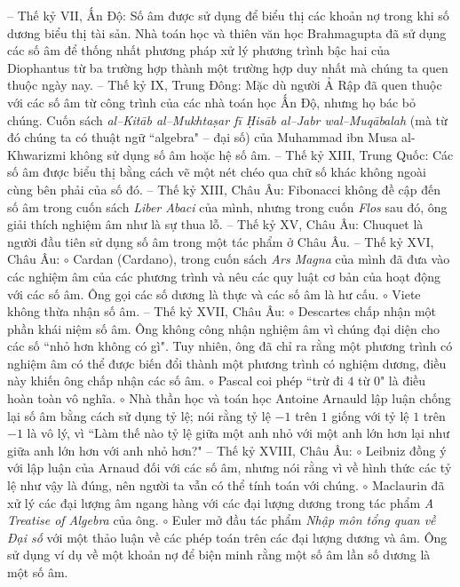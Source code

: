 \begin{multicols}{2}
	\vskip 0.1cm
	-- Thế kỷ VII, Ấn Độ: Số âm được sử dụng để biểu thị các khoản nợ trong khi số dương biểu thị tài sản. Nhà toán học và thiên văn học Brahmagupta đã sử dụng các số âm để thống nhất phương pháp xử lý phương trình bậc hai của Diophantus từ ba trường hợp thành một trường hợp duy nhất mà chúng ta quen thuộc ngày nay.
	\vskip 0.1cm
	-- Thế kỷ IX, Trung Đông: Mặc dù người Ả Rập đã quen thuộc với các số âm từ công trình của các nhà toán học Ấn Độ, nhưng họ bác bỏ chúng. Cuốn sách \textit{al--Kitāb al--Mukhtaṣar fī Ḥisāb al--Jabr wal--Muqābalah} (mà từ đó chúng ta có thuật ngữ ``algebra" -- đại số) của Muhammad ibn Musa al-Khwarizmi không sử dụng số âm hoặc hệ số âm.
	\vskip 0.1cm
	-- Thế kỷ XIII, Trung Quốc: Các số âm được biểu thị bằng cách vẽ một nét chéo qua chữ số khác không ngoài cùng bên phải của số đó.
	\vskip 0.1cm
	-- Thế kỷ XIII, Châu Âu: Fibonacci không đề cập đến số âm trong cuốn sách \textit{Liber Abaci} của mình, nhưng trong cuốn \textit{Flos} sau đó, ông giải thích nghiệm âm như là sự thua lỗ.
	\vskip 0.1cm
	-- Thế kỷ XV, Châu Âu: Chuquet là người đầu tiên sử dụng số âm trong một tác phẩm ở Châu Âu.
	\vskip 0.1cm
	-- Thế kỷ XVI, Châu Âu: 
	\vskip 0.1cm
	$\circ$ Cardan (Cardano), trong cuốn sách \textit{Ars Magna} của mình đã đưa vào các nghiệm âm của các phương trình và nêu các quy luật cơ bản của hoạt động với các số âm. Ông gọi các số dương là thực và các số âm là hư cấu.
	\vskip 0.1cm
	$\circ$ Viete không thừa nhận số âm.
	\vskip 0.1cm
	-- Thế kỷ XVII, Châu Âu:
	\vskip 0.1cm
	$\circ$ Descartes chấp nhận một phần khái niệm số âm. Ông không công nhận nghiệm âm vì chúng đại diện cho các số ``nhỏ hơn không có gì". Tuy nhiên, ông đã chỉ ra rằng một phương trình có nghiệm âm có thể được biến đổi thành một phương trình có nghiệm dương, điều này khiến ông chấp nhận các số âm.
	\vskip 0.1cm
	$\circ$ Pascal coi phép ``trừ đi $4$ từ 0" là điều hoàn toàn vô nghĩa.
	\vskip 0.1cm
	$\circ$ Nhà thần học và toán học Antoine Arnauld lập luận chống lại số âm bằng cách sử dụng tỷ lệ; nói rằng tỷ lệ $-1$ trên $1$ giống với tỷ lệ $1$ trên $-1$ là vô lý, vì ``Làm thế nào tỷ lệ giữa một anh nhỏ với một anh lớn hơn lại như giữa anh lớn hơn với anh nhỏ hơn?"
	\vskip 0.1cm
	-- Thế kỷ XVIII, Châu Âu:
	\vskip 0.1cm
	$\circ$ Leibniz đồng ý với lập luận của Arnaud đối với các số âm, nhưng nói rằng vì về hình thức các tỷ lệ như vậy là đúng, nên người ta vẫn có thể tính toán với chúng.
	\vskip 0.1cm
	$\circ$ Maclaurin đã xử lý các đại lượng âm ngang hàng với các đại lượng dương trong tác phẩm \textit{A Treatise of Algebra} của ông.
	\vskip 0.1cm 
	$\circ$ Euler mở đầu tác phẩm \textit{Nhập môn tổng quan về Đại số} với một thảo luận về các phép toán trên các đại lượng dương và âm. Ông sử dụng ví dụ về một khoản nợ để biện minh rằng một số âm lần số dương là một số âm.  

\end{multicols}
